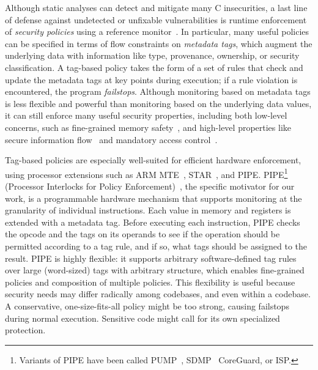 \documentclass{llncs}
\begin{document}
Although static analyses can detect and mitigate many C insecurities, a last line of
defense against undetected or unfixable vulnerabilities is runtime
enforcement of {\em security policies} using a reference
monitor~\cite{Anderson72:PlanningStudy}. In particular, 
many useful policies can be specified in terms of flow constraints on 
\emph{metadata tags}, which augment the underlying data with information like type, provenance,
ownership, or security classification. A tag-based policy takes the form of a set of
rules that check and update the metadata tags at key points during execution; if a rule violation is
encountered, the program \emph{failstops}. 
Although monitoring based on metadata tags is less flexible and powerful than monitoring based on the
underlying data values, it can still enforce many useful security properties, including
both low-level concerns, such as fine-grained memory safety~\cite{Witchel02:MondrianMem},
and high-level properties like secure information flow~\cite{Denning76:SFIlattice} and
mandatory access control~\cite{USDoD85:OrangeBook}.

Tag-based policies are especially well-suited for efficient hardware enforcement, using 
processor extensions such as ARM MTE~\cite{arm-mte},
STAR~\cite{Gollapudi+23}, and
PIPE.  PIPE\footnote{ Variants of PIPE have
been called PUMP~\cite{Dhawan+14}, %
SDMP~\cite{Dover16}%
CoreGuard, or ISP.}
(Processor Interlocks for Policy Enforcement)~\cite{Azevedo+16,Azevedo+15},%
the specific motivator for our work, 
is a programmable hardware mechanism that supports monitoring 
at the granularity of individual instructions. 
Each value in memory and registers
is extended with a metadata tag. Before executing each instruction,
PIPE checks the opcode and the tags on its operands to see if the operation 
should be permitted according to a tag rule, and if so, what tags should be 
assigned to the result.
PIPE is highly flexible: it supports
arbitrary software-defined tag rules over large (word-sized) tags with arbitrary structure,
which enables fine-grained policies and composition of multiple policies. This flexibility 
is useful because security needs may differ radically among codebases,
and even within a codebase. A conservative, one-size-fits-all policy might be too strong,
causing failstops during normal execution. Sensitive code might call for its own specialized
protection.
 
\end{document}
